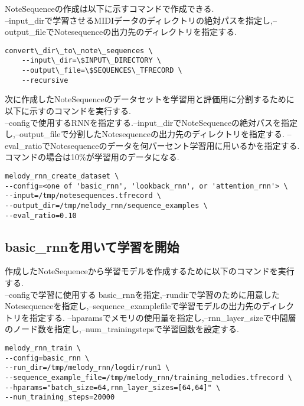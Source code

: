 NoteSequenceの作成は以下に示すコマンドで作成できる.\\
--input\_dirで学習させるMIDIデータのディレクトリの絶対パスを指定し,--output\_fileでNotesequenceの出力先のディレクトリを指定する.\\
\begin{lstlisting}[basicstyle=\ttfamily\footnotesize,frame=single]
    convert\_dir\_to\_note\_sequences \
    --input\_dir=\$INPUT\_DIRECTORY \
    --output\_file=\$SEQUENCES\_TFRECORD \
    --recursive
\end{lstlisting}
次に作成したNoteSequenceのデータセットを学習用と評価用に分割するために以下に示すのコマンドを実行する.\\
--configで使用するRNNを指定する.--input\_dirでNoteSequenceの絶対パスを指定し,--output\_fileで分割したNotesequenceの出力先のディレクトリを指定する.
--eval\_ratioでNotesequenceのデータを何パーセント学習用に用いるかを指定する.コマンドの場合は10\%が学習用のデータになる.
\begin{lstlisting}[basicstyle=\ttfamily\footnotesize,frame=single]
melody_rnn_create_dataset \
--config=<one of 'basic_rnn', 'lookback_rnn', or 'attention_rnn'> \
--input=/tmp/notesequences.tfrecord \
--output_dir=/tmp/melody_rnn/sequence_examples \
--eval_ratio=0.10
\end{lstlisting}
\subsection{basic\_rnnを用いて学習を開始}
作成したNoteSequenceから学習モデルを作成するために以下のコマンドを実行する.\\
--configで学習に使用するbasic\_rnnを指定,--rundirで学習のために用意したNotesequenceを指定し,--sequence\_examplefileで学習モデルの出力先のディレクトリを指定する.
--hparamsでメモリの使用量を指定し,--rnn\_layer\_sizeで中間層のノード数を指定し,--num\_trainingstepsで学習回数を設定する.\\
\begin{lstlisting}[basicstyle=\ttfamily\footnotesize,frame=single]
melody_rnn_train \
--config=basic_rnn \
--run_dir=/tmp/melody_rnn/logdir/run1 \
--sequence_example_file=/tmp/melody_rnn/training_melodies.tfrecord \
--hparams="batch_size=64,rnn_layer_sizes=[64,64]" \
--num_training_steps=20000
\end{lstlisting}

